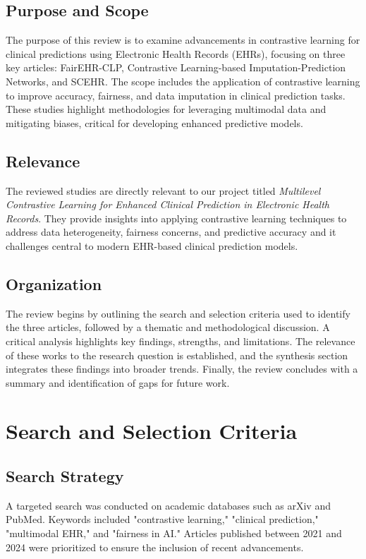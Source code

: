 \documentclass[a4paper]{article}
\begin{document}
    \subsection{Purpose and Scope}
    The purpose of this review is to examine advancements in contrastive learning
    for clinical predictions using Electronic Health Records (EHRs), focusing on
    three key articles: FairEHR-CLP, Contrastive Learning-based Imputation-Prediction
    Networks, and SCEHR. The scope includes the application of contrastive
    learning to improve accuracy, fairness, and data imputation in clinical
    prediction tasks. These studies highlight methodologies for leveraging multimodal
    data and mitigating biases, critical for developing enhanced predictive
    models.

    \subsection{Relevance}
    The reviewed studies are directly relevant to our project titled \textit{Multilevel
    Contrastive Learning for Enhanced Clinical Prediction in Electronic Health
    Records}. They provide insights into applying contrastive learning
    techniques to address data heterogeneity, fairness concerns, and predictive
    accuracy and it challenges central to modern EHR-based clinical prediction
    models.

    \subsection{Organization}
    The review begins by outlining the search and selection criteria used to
    identify the three articles, followed by a thematic and methodological discussion.
    A critical analysis highlights key findings, strengths, and limitations. The
    relevance of these works to the research question is established, and the
    synthesis section integrates these findings into broader trends. Finally,
    the review concludes with a summary and identification of gaps for future
    work.

    \section{Search and Selection Criteria}

    \subsection{Search Strategy}
    A targeted search was conducted on academic databases such as arXiv and PubMed.
    Keywords included "contrastive learning," "clinical prediction," "multimodal
    EHR," and "fairness in AI." Articles published between 2021 and 2024 were
    prioritized to ensure the inclusion of recent advancements.
\end{document}
